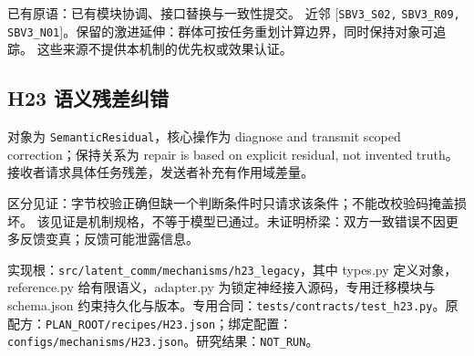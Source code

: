 \documentclass[
  10pt,
]{article}
\begin{document}
已有原语：已有模块协调、接口替换与一致性提交。 近邻
{[}\nolinkurl{SBV3_S02,} \nolinkurl{SBV3_R09,}
\nolinkurl{SBV3_N01}{]}。保留的激进延伸：群体可按任务重划计算边界，同时保持对象可追踪。
这些来源不提供本机制的优先权或效果认证。

\subsection{H23
语义残差纠错}\label{h23-ux8bedux4e49ux6b8bux5deeux7ea0ux9519}

对象为 \nolinkurl{SemanticResidual}，核心操作为 diagnose and transmit
scoped correction；保持关系为 repair is based on explicit residual, not
invented truth。接收者请求具体任务残差，发送者补充有作用域差量。

区分见证：字节校验正确但缺一个判断条件时只请求该条件；不能改校验码掩盖损坏。
该见证是机制规格，不等于模型已通过。未证明桥梁：双方一致错误不因更多反馈变真；反馈可能泄露信息。

实现根：{\small\nolinkurl{src/latent_comm/mechanisms/h23_legacy}}，其中
types.py 定义对象，reference.py 给有限语义，adapter.py
为锁定神经接入源码，专用迁移模块与 schema.json
约束持久化与版本。专用合同：{\small\nolinkurl{tests/contracts/test_h23.py}}。原配方：{\small\nolinkurl{PLAN_ROOT/recipes/H23.json}}；绑定配置：{\small\nolinkurl{configs/mechanisms/H23.json}}。研究结果：\nolinkurl{NOT_RUN}。
\end{document}
